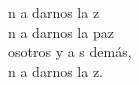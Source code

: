 \begin{cancion}[La paz][]%
	n a darnos la z\\
	n a darnos la paz\\
	osotros y a s demás,\\
	n a darnos la z.\\
\end{cancion}%
